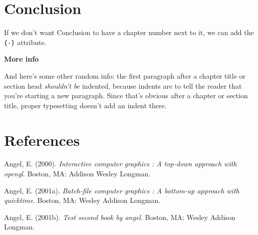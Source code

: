 \documentclass[12pt,twoside]{dukestatscithesis}
\theoremstyle{definition}
\theoremstyle{definition}
\theoremstyle{definition}
\theoremstyle{remark}
\begin{document}
\chapter*{Conclusion}\label{conclusion}

If we don't want Conclusion to have a chapter number next to it, we can
add the \texttt{\{-\}} attribute.

\textbf{More info}

And here's some other random info: the first paragraph after a chapter
title or section head \emph{shouldn't be} indented, because indents are
to tell the reader that you're starting a new paragraph. Since that's
obvious after a chapter or section title, proper typesetting doesn't add
an indent there.

\backmatter

\chapter*{References}\label{references}


\noindent

\setlength{\parindent}{-0.20in} \setlength{\leftskip}{0.20in}
\setlength{\parskip}{8pt}

\hypertarget{refs}{}
\hypertarget{ref-angel2000}{}
Angel, E. (2000). \emph{Interactive computer graphics : A top-down
approach with opengl}. Boston, MA: Addison Wesley Longman.

\hypertarget{ref-angel2001}{}
Angel, E. (2001a). \emph{Batch-file computer graphics : A bottom-up
approach with quicktime}. Boston, MA: Wesley Addison Longman.

\hypertarget{ref-angel2002a}{}
Angel, E. (2001b). \emph{Test second book by angel}. Boston, MA: Wesley
Addison Longman.


\end{document}
